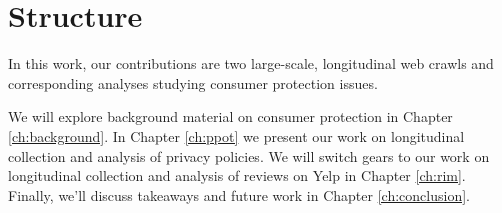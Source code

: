 \section{Structure}

In this work, our contributions are two large-scale, longitudinal web crawls and corresponding analyses studying consumer protection issues. 

We will explore background material on consumer protection in Chapter \ref{ch:background}. In Chapter \ref{ch:ppot} we present our work on longitudinal collection and analysis of privacy policies.  We will switch gears to our work on longitudinal collection and analysis of reviews on Yelp in Chapter \ref{ch:rim}.  Finally, we'll discuss takeaways and future work in Chapter \ref{ch:conclusion}. 